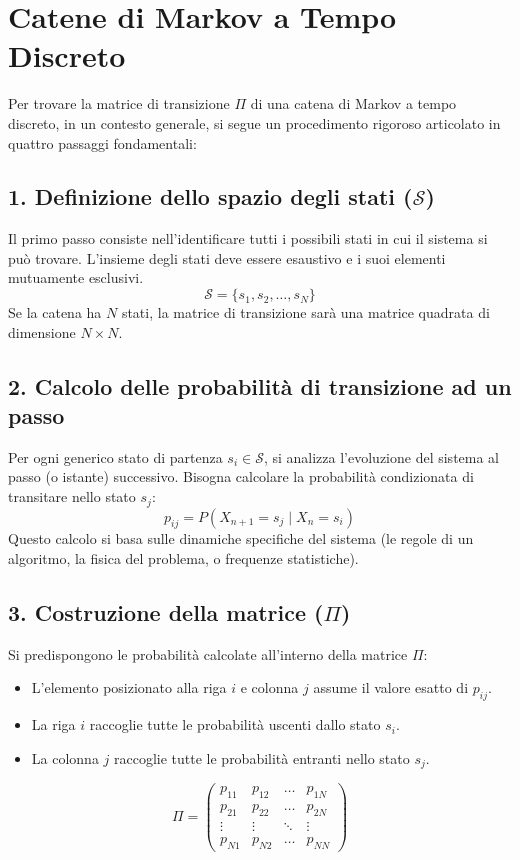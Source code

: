 \documentclass[12pt]{extarticle} %
\begin{document}
\newpage
\section{Catene di Markov a Tempo Discreto}

Per trovare la matrice di transizione $\Pi$ di una catena di Markov a tempo discreto, in un contesto generale, si segue un procedimento rigoroso articolato in quattro passaggi fondamentali:

\subsection*{1. Definizione dello spazio degli stati ($\mathcal{S}$)}
Il primo passo consiste nell'identificare tutti i possibili stati in cui il sistema si può trovare. L'insieme degli stati deve essere esaustivo e i suoi elementi mutuamente esclusivi. 
$$ \mathcal{S} = \{s_1, s_2, \dots, s_N\} $$
Se la catena ha $N$ stati, la matrice di transizione sarà una matrice quadrata di dimensione $N \times N$.

\subsection*{2. Calcolo delle probabilità di transizione ad un passo}
Per ogni generico stato di partenza $s_i \in \mathcal{S}$, si analizza l'evoluzione del sistema al passo (o istante) successivo. Bisogna calcolare la probabilità condizionata di transitare nello stato $s_j$:
$$ p_{ij} = P(X_{n+1} = s_j \mid X_n = s_i) $$
Questo calcolo si basa sulle dinamiche specifiche del sistema (le regole di un algoritmo, la fisica del problema, o frequenze statistiche).

\subsection*{3. Costruzione della matrice ($\Pi$)}
Si predispongono le probabilità calcolate all'interno della matrice $\Pi$:
\begin{itemize}
    \item L'elemento posizionato alla riga $i$ e colonna $j$ assume il valore esatto di $p_{ij}$.
    \item La riga $i$ raccoglie tutte le probabilità uscenti dallo stato $s_i$.
    \item La colonna $j$ raccoglie tutte le probabilità entranti nello stato $s_j$.
\end{itemize}

$$
\Pi = \begin{pmatrix}
p_{11} & p_{12} & \dots & p_{1N} \\
p_{21} & p_{22} & \dots & p_{2N} \\
\vdots & \vdots & \ddots & \vdots \\
p_{N1} & p_{N2} & \dots & p_{NN}
\end{pmatrix}
$$
\end{document}

